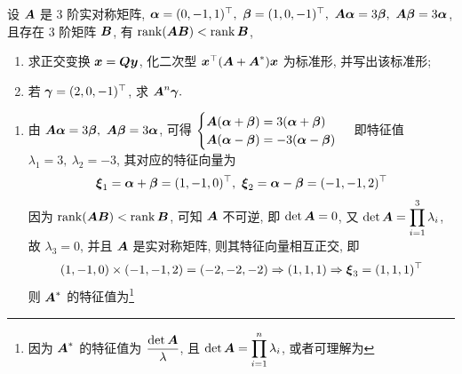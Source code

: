 \begin{example}
    设 $\vb*{A}$ 是 3 阶实对称矩阵, $\vb*{\alpha}=(0,-1,1)^\top,~\vb*{\beta}=(1,0,-1)^\top,~\vb*{A\alpha}=3\vb*{\beta},~\vb*{A\beta}=3\vb*{\alpha}$, 且存在 3 阶矩阵 $\vb*{B}$, 有 $\rank(\vb*{AB})<\rank\vb*{B}$,
    \begin{enumerate}[label=(\arabic{*})]
        \item 求正交变换 $\vb*{x}=\vb*{Qy}$, 化二次型 $\vb*{x}^\top\qty(\vb*{A}+\vb*{A}^*)\vb*{x}$ 为标准形, 并写出该标准形;
        \item 若 $\vb*{\gamma}=(2,0,-1)^\top$, 求 $\vb*{A}^n\vb*{\gamma}.$
    \end{enumerate}
\end{example}
\begin{solution}
    \begin{enumerate}[label=(\arabic{*})]
        \item 由 $\vb*{A\alpha}=3\vb*{\beta},~\vb*{A\beta}=3\vb*{\alpha}$, 可得 $\begin{cases}
                      \vb*{A}(\vb*{\alpha}+\vb*{\beta})=3(\vb*{\alpha}+\vb*{\beta}) \\
                      \vb*{A}(\vb*{\alpha}-\vb*{\beta})=-3(\vb*{\alpha}-\vb*{\beta})
                  \end{cases}$ 即特征值 $\lambda_1=3,~\lambda_2=-3$, 其对应的特征向量为 $$\vb*{\xi}_1=\vb*{\alpha}+\vb*{\beta}=(1,-1,0)^\top,~\vb*{\xi}_2=\vb*{\alpha}-\vb*{\beta}=(-1,-1,2)^\top$$
              因为 $\rank(\vb*{AB})<\rank\vb*{B}$, 可知 $\vb*{A}$ 不可逆, 即 $\det\vb*{A}=0$, 又 $\det\vb*{A}=\displaystyle\prod_{i=1}^{3}\lambda_i$, 故 $\lambda_3=0$, 并且 $\vb*{A}$ 是实对称矩阵, 则其特征向量相互正交, 即
              $$(1,-1,0)\times(-1,-1,2)=(-2,-2,-2)\Rightarrow (1,1,1)\Rightarrow \vb*{\xi}_3=(1,1,1)^\top$$
              则 $\vb*{A}^*$ 的特征值为\footnote{因为 $\vb*{A}^*$ 的特征值为 $\dfrac{\det\vb*{A}}{\lambda}$, 且 $\det\vb*{A}=\displaystyle\prod_{i=1}^{n}\lambda_i$, 或者可理解为 }
\end{enumerate}
\end{solution}

